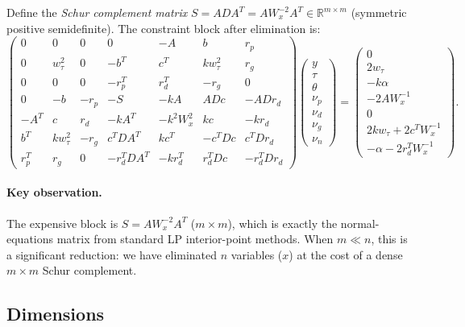 \documentclass{article}
\newcommand{\R}{\mathbb{R}}
\begin{document}
Define the \emph{Schur complement matrix} $S = ADA^T = AW_x^{-2}A^T \in \R^{m \times m}$ (symmetric positive semidefinite). The constraint block after elimination is:
\begin{equation} \label{eq:elim_system}
\begin{pmatrix}
  0 & 0 & 0 & 0 & -A & b & r_p \\
  0 & w_\tau^2 & 0 & -b^T & c^T & kw_\tau^2 & r_g \\
  0 & 0 & 0 & -r_p^T & r_d^T & -r_g & 0 \\
  0 & -b & -r_p & -S & -kA & ADc & -ADr_d \\
  -A^T & c & r_d & -kA^T & -k^2W_x^2 & kc & -kr_d \\
  b^T & kw_\tau^2 & -r_g & c^TDA^T & kc^T & -c^TDc & c^TDr_d \\
  r_p^T & r_g & 0 & -r_d^TDA^T & -kr_d^T & r_d^TDc & -r_d^TDr_d
\end{pmatrix}
\begin{pmatrix} y \\ \tau \\ \theta \\ \nu_p \\ \nu_d \\ \nu_g \\ \nu_n \end{pmatrix}
=
\begin{pmatrix} 0 \\ 2w_\tau \\ -k\alpha \\ -2AW_x^{-1} \\ 0 \\ 2kw_\tau + 2c^TW_x^{-1} \\ -\alpha - 2r_d^TW_x^{-1} \end{pmatrix}.
\end{equation}

\paragraph{Key observation.} The expensive block is $S = AW_x^{-2}A^T$ ($m \times m$), which is exactly the normal-equations matrix from standard LP interior-point methods. When $m \ll n$, this is a significant reduction: we have eliminated $n$ variables ($x$) at the cost of a dense $m \times m$ Schur complement.

\subsection{Dimensions}
\end{document}

